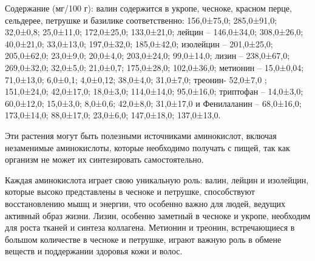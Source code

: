 \begin{multicols}{2}
Содержание (мг/100 г): валин содержится в укропе, чесноке, красном
перце, сельдерее, петрушке и базилике соответственно: 156,0±75,0;
285,0±91,0; 32,0±0,8; 25,0±11,0; 172,0±25,0; 133,0±21,0; лейцин --
146,0±34,0; 308,0±26,0; 40,0±21,0; 33,0±13,0; 197,0±32,0; 185,0±42,0;
изолейцин -- 201,0±25,0; 205,0±62,0; 23,0±9,0; 20,0±4,0; 203,0±24,0;
99,0±14,0; лизин -- 238,0±67,0; 269,0±32,0; 32,0±5,0; 21,0±0,7;
175,0±28,0; 102,0±36,0; метионин -- 15,0±0,04; 71,0±13,0; 6,0±0,1;
4,0±0,12; 38,0±4,0; 31,0±7,0; треонин- 52,0±7,0 ; 151,0±24,0; 42,0±17,0;
18,0±3,0; 114,0±14,0; 95,0±16,0; триптофан -- 14,0±3,0; 60,0±12,0;
15,0±3,0; 8,0±0,6; 42,0±8,0; 31,0±17,0 и Фенилаланин -- 68,0±16,0;
173,0±14,0; 88,0±17,0; 23,0±6,0; 147,0±18,0; 137,0±13,0.

Эти растения могут быть полезными источниками аминокислот, включая
незаменимые аминокислоты, которые необходимо получать с пищей, так как
организм не может их синтезировать самостоятельно.

Каждая аминокислота играет свою уникальную роль: валин, лейцин и
изолейцин, которые высоко представлены в чесноке и петрушке,
способствуют восстановлению мышц и энергии, что особенно важно для
людей, ведущих активный образ жизни. Лизин, особенно заметный в чесноке
и укропе, необходим для роста тканей и синтеза коллагена. Метионин и
треонин, встречающиеся в большом количестве в чесноке и петрушке, играют
важную роль в обмене веществ и поддержании здоровья кожи и волос.


\end{multicols}
